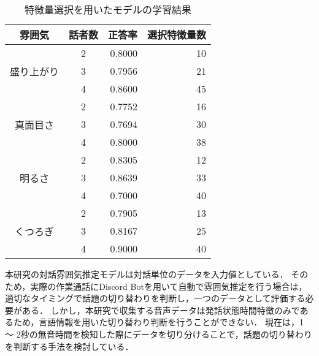 \begin{table}[t]
    \caption{特徴量選択を用いたモデルの学習結果}
    \centering
    \begin{tabular}{|c|c|r|r|}
        \hline
        雰囲気 & 話者数 & 正答率 & 選択特徴量数 \\
        \hline\hline
        \multirow{3}{*}{盛り上がり} & 2 & 0.8000 & 10 \\
        & 3 & 0.7956 & 21 \\
        & 4 & 0.8600 & 45 \\ \hline
        \multirow{3}{*}{真面目さ} & 2 & 0.7752 & 16 \\
        & 3 & 0.7694 & 30 \\
        & 4 & 0.8000 & 38 \\ \hline
        \multirow{3}{*}{明るさ} & 2 & 0.8305 & 12 \\
        & 3 & 0.8639 & 33 \\
        & 4 & 0.7000 & 40 \\ \hline
        \multirow{3}{*}{くつろぎ} & 2 & 0.7905 & 13 \\
        & 3 & 0.8167 & 25 \\
        & 4 & 0.9000 & 40 \\ \hline
    \end{tabular}
    \label{tab:learn_result_with_ga}
\end{table}

本研究の対話雰囲気推定モデルは対話単位のデータを入力値としている．
そのため，実際の作業通話にDiscord Botを用いて自動で雰囲気推定を行う場合は，適切なタイミングで話題の切り替わりを判断し，一つのデータとして評価する必要がある．
しかし，本研究で収集する音声データは発話状態時間特徴のみであるため，言語情報を用いた切り替わり判断を行うことができない．
現在は，1 〜 2秒の無音時間を検知した際にデータを切り分けることで，話題の切り替わりを判断する手法を検討している． 

